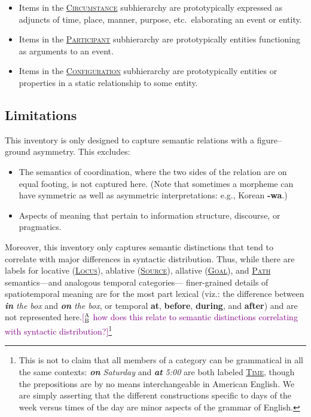 \documentclass[11pt,letterpaper]{article}
\newcommand{\ensuretext}[1]{#1}
\newcommand{\abmarker}{\ensuretext{\textcolor{purple}{\ensuremath{^{\textsc{A}}_{\textsc{B}}}}}}
\newcommand{\arkcomment}[3]{\ensuretext{\textcolor{#3}{[#1 #2]}}}
\newcommand{\ab}[1]{\arkcomment{\abmarker}{#1}{purple}}
\newcommand{\p}[1]{\textbf{\textsf{#1}}} %
\newcommand{\lbl}[1]{\textsc{#1}} %
\newcommand{\sst}[1]{\lbl{#1}} %
\newcommand{\psst}[1]{\textcolor{mdgreen}{\hyperref[sec:#1]{\sst{#1}}}} %
\newcommand{\pex}[1]{\textit{#1}} %
\begin{document}
\begin{itemize}
\item Items in the \psst{Circumstance} subhierarchy are prototypically 
expressed as adjuncts of time, place, manner, purpose, etc.\ 
elaborating an event or entity.
\item Items in the \psst{Participant} subhierarchy are prototypically 
entities functioning as arguments to an event.
\item Items in the \psst{Configuration} subhierarchy are prototypically
entities or properties in a static relationship to some entity.
\end{itemize}

\subsection{Limitations}

This inventory is only designed to capture semantic relations 
with a figure--ground asymmetry. This excludes:
\begin{itemize}
  \item The semantics of coordination, where the two sides of the relation 
are on equal footing, is not captured here. (Note that sometimes a morpheme can 
have symmetric as well as asymmetric interpretations: e.g., Korean \p{-wa}.)
  \item Aspects of meaning that pertain to information structure, discourse, 
or pragmatics.
\end{itemize}
Moreover, this inventory only captures semantic distinctions 
that tend to correlate with major differences in syntactic distribution. 
Thus, while there are labels for locative (\psst{Locus}), ablative (\psst{Source}), 
allative (\psst{Goal}), and \psst{Path} semantics---and analogous temporal categories---%
finer-grained details of spatiotemporal meaning are for the most part lexical 
(viz.: the difference between \pex{\p{in} the box} and \pex{\p{on} the box}, 
or temporal \p{at}, \p{before}, \p{during}, and \p{after}) and are not represented here.\ab{how does this relate to semantic distinctions correlating with syntactic distribution?}\footnote{This is not to claim
that all members of a category can be grammatical in all the same contexts: 
\pex{\p{on} Saturday} and \pex{\p{at} 5:00} are both labeled \psst{Time}, 
though the prepositions are by no means interchangeable in American English. 
We are simply asserting that the different constructions specific to days of the week 
versus times of the day are minor aspects of the grammar of English.}
\end{document}
